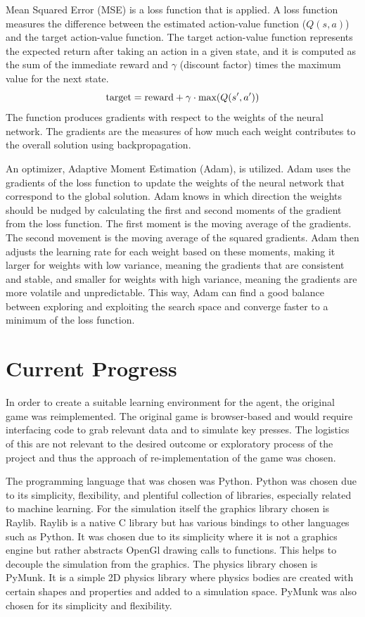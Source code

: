 \documentclass[letterpaper]{article} %
\begin{document}
\par Mean Squared Error (MSE) is a loss function that is applied. A loss function measures the difference between the estimated action-value function ($Q(s, a)$) and the target action-value function. The target action-value function represents the expected return after taking an action in a given state, and it is computed as the sum of the immediate reward and $\gamma$ (discount factor) times the maximum value for the next state.
$$
\textnormal{target} = \textnormal{reward} + \gamma \cdot \textnormal{max}(Q(s', a'))
$$
The function produces gradients with respect to the weights of the neural network. The gradients are the measures of how much each weight contributes to the overall solution using backpropagation.

\par An optimizer, Adaptive Moment Estimation (Adam), is utilized. Adam uses the gradients of the loss function to update the weights of the neural network that correspond to the global solution. Adam knows in which direction the weights should be nudged by calculating the first and second moments of the gradient from the loss function. The first moment is the moving average of the gradients. The second movement is the moving average of the squared gradients. Adam then adjusts the learning rate for each weight based on these moments, making it larger for weights with low variance, meaning the gradients that are consistent and stable, and smaller for weights with high variance, meaning the gradients are more volatile and unpredictable. This way, Adam can find a good balance between exploring and exploiting the search space and converge faster to a minimum of the loss function.

\section{Current Progress}

In order to create a suitable learning environment for the agent, the original game was reimplemented. The original game is browser-based and would require interfacing code to grab relevant data and to simulate key presses. The logistics of this are not relevant to the desired outcome or exploratory process of the project and thus the approach of re-implementation of the game was chosen.

\par The programming language that was chosen was Python. Python was chosen due to its simplicity, flexibility, and plentiful collection of libraries, especially related to machine learning. For the simulation itself the graphics library chosen is Raylib. Raylib is a native C library but has various bindings to other languages such as Python. It was chosen due to its simplicity where it is not a graphics engine but rather abstracts OpenGl drawing calls to functions. This helps to decouple the simulation from the graphics. The physics library chosen is PyMunk. It is a simple 2D physics library where physics bodies are created with certain shapes and properties and added to a simulation space. PyMunk was also chosen for its simplicity and flexibility.
\end{document}
